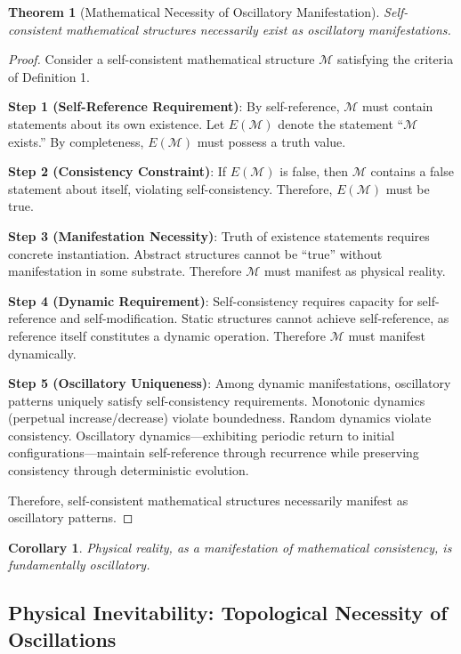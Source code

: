 \documentclass[12pt,a4paper]{article}
\newtheorem{corollary}{Corollary}
\newtheorem{theorem}{Theorem}
\begin{document}
\begin{theorem}[Mathematical Necessity of Oscillatory Manifestation]
\label{thm:oscillatory_necessity}
Self-consistent mathematical structures necessarily exist as oscillatory manifestations.
\end{theorem}

\begin{proof}
Consider a self-consistent mathematical structure $\mathcal{M}$ satisfying the criteria of Definition 1.

\textbf{Step 1 (Self-Reference Requirement)}: By self-reference, $\mathcal{M}$ must contain statements about its own existence. Let $E(\mathcal{M})$ denote the statement ``$\mathcal{M}$ exists.'' By completeness, $E(\mathcal{M})$ must possess a truth value.

\textbf{Step 2 (Consistency Constraint)}: If $E(\mathcal{M})$ is false, then $\mathcal{M}$ contains a false statement about itself, violating self-consistency. Therefore, $E(\mathcal{M})$ must be true.

\textbf{Step 3 (Manifestation Necessity)}: Truth of existence statements requires concrete instantiation. Abstract structures cannot be ``true'' without manifestation in some substrate. Therefore $\mathcal{M}$ must manifest as physical reality.

\textbf{Step 4 (Dynamic Requirement)}: Self-consistency requires capacity for self-reference and self-modification. Static structures cannot achieve self-reference, as reference itself constitutes a dynamic operation. Therefore $\mathcal{M}$ must manifest dynamically.

\textbf{Step 5 (Oscillatory Uniqueness)}: Among dynamic manifestations, oscillatory patterns uniquely satisfy self-consistency requirements. Monotonic dynamics (perpetual increase/decrease) violate boundedness. Random dynamics violate consistency. Oscillatory dynamics—exhibiting periodic return to initial configurations—maintain self-reference through recurrence while preserving consistency through deterministic evolution.

Therefore, self-consistent mathematical structures necessarily manifest as oscillatory patterns.
\end{proof}

\begin{corollary}
Physical reality, as a manifestation of mathematical consistency, is fundamentally oscillatory.
\end{corollary}

\subsection{Physical Inevitability: Topological Necessity of Oscillations}
\end{document}
